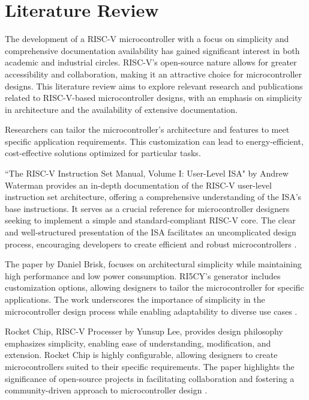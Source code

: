 \chapter{Literature Review}
The development of a RISC-V microcontroller with a focus on simplicity and comprehensive documentation availability has gained significant interest in both 
academic and industrial circles. RISC-V's open-source nature allows for greater accessibility and collaboration, making it an attractive choice for microcontroller designs. 
This literature review aims to explore relevant research and publications related to RISC-V-based microcontroller designs, 
with an emphasis on simplicity in architecture and the availability of extensive documentation.

Researchers can tailor the microcontroller's architecture and features to meet specific application requirements. 
This customization can lead to energy-efficient, cost-effective solutions optimized for particular tasks\cite{riscvISA}.

``The RISC-V Instruction Set Manual, Volume I: User-Level ISA" by Andrew Waterman provides an in-depth documentation of the RISC-V user-level instruction set architecture, 
offering a comprehensive understanding of the ISA's base instructions. It serves as a crucial reference for microcontroller designers seeking to implement 
a simple and standard-compliant RISC-V core. The clear and well-structured presentation of the ISA facilitates an uncomplicated design process, 
encouraging developers to create efficient and robust microcontrollers \cite{riscvISA}.


The paper by Daniel Brisk, focuses on architectural simplicity while maintaining high performance and low power consumption. 
RI5CY's generator includes customization options, allowing designers to tailor the microcontroller for specific applications. 
The work underscores the importance of simplicity in the microcontroller design process while enabling adaptability to 
diverse use cases \cite{ri5cy}.


Rocket Chip, RISC-V Processer by Yunsup Lee, provides design philosophy emphasizes simplicity, enabling ease of understanding, modification, and extension. 
Rocket Chip is highly configurable, allowing designers to create microcontrollers suited to their specific requirements. 
The paper highlights the significance of open-source projects in facilitating collaboration and fostering a community-driven approach to 
microcontroller design \cite{rocket_chip}.


